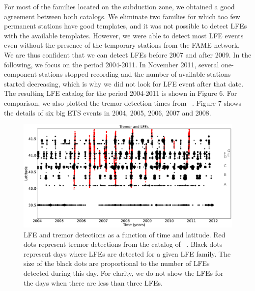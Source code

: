 \documentclass[draft]{agujournal2019}
\begin{document}
For most of the families located on the subduction zone, we obtained a good agreement between both catalogs. We eliminate two families for which too few permanent stations have good templates, and it was not possible to detect LFEs with the available templates. However, we were able to detect most LFE events even without the presence of the temporary stations from the FAME network. We are thus confident that we can detect LFEs before 2007 and after 2009. In the following, we focus on the period 2004-2011. In November 2011, several one-component stations stopped recording and the number of available stations started decreasing, which is why we did not look for LFE event after that date. The resulting LFE catalog for the period 2004-2011 is shown in Figure 6. For comparison, we also plotted the tremor detection times from ~. Figure 7 shows the details of six big ETS events in 2004, 2005, 2006, 2007 and 2008. \\

\begin{figure}
\noindent\includegraphics[width=\textwidth, trim={0cm 0cm 0cm 0cm},clip]{figures/tremor_nb_perm_3.eps}
\caption{LFE and tremor detections as a function of time and latitude. Red dots represent tremor detections from the catalog of ~. Black dots represent days where LFEs are detected for a given LFE family. The size of the black dots are proportional to the number of LFEs detected during this day. For clarity, we do not show the LFEs for the days when there are less than three LFEs.}
\label{pngfiguresample}
\end{figure}
\end{document}
